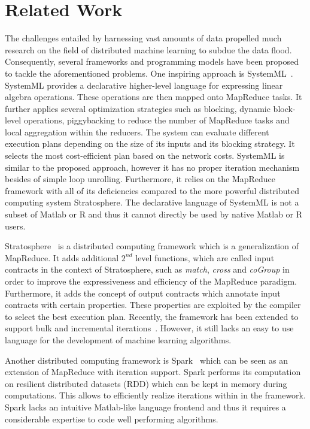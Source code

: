 \documentclass{dima}
\begin{document}
\section{Related Work}

The challenges entailed by harnessing vast amounts of data propelled much research on the field of distributed machine learning to subdue the data flood.
Consequently, several frameworks and programming models have been proposed to tackle the aforementioned problems.
One inspiring approach is SystemML~\cite{ghoting:2011a}.
SystemML provides a declarative higher-level language for expressing linear algebra operations.
These operations are then mapped onto MapReduce tasks.
It further applies several optimization strategies such as blocking, dynamic block-level operations, piggybacking to reduce the number of MapReduce tasks and local aggregation within the reducers.
The system can evaluate different execution plans depending on the size of its inputs and its blocking strategy.
It selects the most cost-efficient plan based on the network costs.
SystemML is similar to the proposed approach, however it has no proper iteration mechanism besides of simple loop unrolling.
Furthermore, it relies on the MapReduce framework with all of its deficiencies compared to the more powerful distributed computing system Stratosphere.
The declarative language of SystemML is not a subset of Matlab or R and thus it cannot directly be used by native Matlab or R users.

Stratosphere~\cite{battre:2010a} is a distributed computing framework which is a generalization of MapReduce.
It adds additional $2^{nd}$ level functions, which are called input contracts in the context of Stratosphere, such as \emph{match}, \emph{cross} and \emph{coGroup} in order to improve the expressiveness and efficiency of the MapReduce paradigm.
Furthermore, it adds the concept of output contracts which annotate input contracts with certain properties.
These properties are exploited by the compiler to select the best execution plan.
Recently, the framework has been extended to support bulk and incremental iterations~\cite{ewen:pve2012a}.
However, it still lacks an easy to use language for the development of machine learning algorithms.

Another distributed computing framework is Spark~\cite{zaharia:2010a} which can be seen as an extension of MapReduce with iteration support.
Spark performs its computation on resilient distributed datasets (RDD) which can be kept in memory during computations.
This allows to efficiently realize iterations within in the framework.
Spark lacks an intuitive Matlab-like language frontend and thus it requires a considerable expertise to code well performing algorithms.
\end{document}
